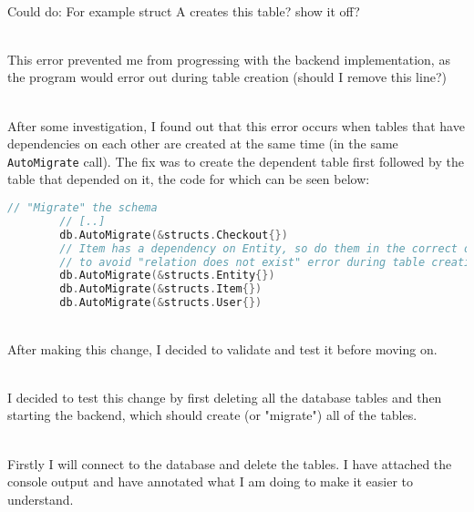 \documentclass[../../main.tex]{subfiles}
\begin{document}
\noindent \\Could do: For example struct A creates this table? show it off?

\noindent \\ This error prevented me from progressing with the backend implementation, as the program would error out during table creation (should I remove this line?)

\noindent \\ After some investigation, I found out that this error occurs when tables that have dependencies on each other are created at the same time (in the same \lstinline{AutoMigrate} call). The fix was to create the dependent table first followed by the table that depended on it, the code for which can be seen below:

\begin{lstlisting}[language=Go]
        // "Migrate" the schema
        // [..]
        db.AutoMigrate(&structs.Checkout{})
        // Item has a dependency on Entity, so do them in the correct order
        // to avoid "relation does not exist" error during table creation.
        db.AutoMigrate(&structs.Entity{})
        db.AutoMigrate(&structs.Item{})
        db.AutoMigrate(&structs.User{})
    \end{lstlisting}

\noindent \\ After making this change, I decided to validate and test it before moving on.

\noindent \\ I decided to test this change by first deleting all the database tables and then starting the backend, which should create (or "migrate") all of the tables.

\noindent \\ Firstly I will connect to the database and delete the tables. I have attached the console output and have annotated what I am doing to make it easier to understand.

\end{document}
